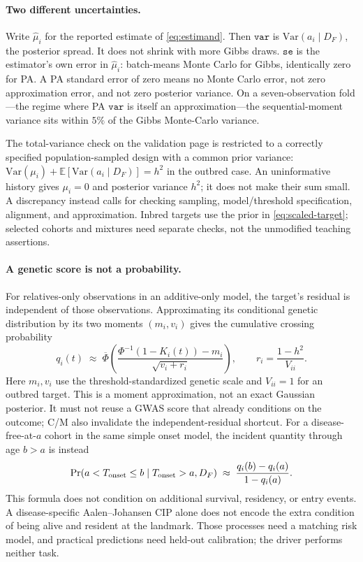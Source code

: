 \documentclass[11pt,a4paper]{article}
\newcommand{\E}{\mathbb{E}}
\newcommand{\Var}{\mathrm{Var}}
\newcommand{\h}{h^{2}}
\begin{document}
\paragraph{Two different uncertainties.}
Write $\widehat{\mu}_i$ for the reported estimate of \eqref{eq:estimand}.
Then $\mathtt{var}$ is $\Var(a_i\mid D_F)$, the posterior spread.
It does not shrink with more Gibbs draws.
$\mathtt{se}$ is the estimator's own error in $\widehat{\mu}_i$:
batch-means Monte Carlo for Gibbs, identically zero for PA.
A PA standard error of zero means no Monte Carlo error, not zero
approximation error, and not zero posterior variance.
On a seven-observation fold---the regime where PA $\mathtt{var}$ is
itself an approximation---the sequential-moment variance sits within
$5\%$ of the Gibbs Monte-Carlo variance.

The total-variance check on the validation page is restricted to a correctly
specified population-sampled design with a common prior variance:
$\Var(\mu_i)+\E[\Var(a_i\mid D_F)]=\h$ in the outbred case.
An uninformative history gives $\mu_i=0$ and posterior variance $\h$;
it does not make their sum small. A discrepancy instead calls for
checking sampling, model/threshold specification, alignment, and
approximation. Inbred targets use the prior in
\eqref{eq:scaled-target}; selected cohorts and mixtures need separate
checks, not the unmodified teaching assertions.

\paragraph{A genetic score is not a probability.}
For relatives-only observations in an additive-only model, the target's
residual is independent of those observations. Approximating its
conditional genetic distribution by its two moments $(m_i,v_i)$ gives
the cumulative crossing probability
\begin{equation}
 q_i(t)\;\approx\;
 \overline\Phi\!\left(
 \frac{\Phi^{-1}(1-K_i(t))-m_i}{\sqrt{v_i+r_i}}\right),
 \qquad r_i=\frac{1-\h}{V_{ii}}.
 \label{eq:risk}
\end{equation}
Here $m_i,v_i$ use the threshold-standardized genetic scale and
$V_{ii}=1$ for an outbred target. This is a moment approximation, not
an exact Gaussian posterior. It must not reuse a GWAS score that already
conditions on the outcome; C/M also invalidate the independent-residual
shortcut. For a disease-free-at-$a$ cohort in the same simple onset model,
the incident quantity through age $b>a$ is instead
\begin{equation}
 \Pr(a<T_{\rm onset}\le b\mid T_{\rm onset}>a,D_F)
 \;\approx\;\frac{q_i(b)-q_i(a)}{1-q_i(a)}.
 \label{eq:incident-risk}
\end{equation}
This formula does not condition on additional survival, residency, or
entry events. A disease-specific Aalen--Johansen CIP alone does not
encode the extra condition of being alive and resident at the landmark.
Those processes need a matching risk model, and practical predictions
need held-out calibration; the driver performs neither task.
\end{document}
